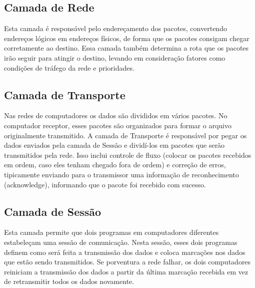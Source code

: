 
\subsection{Camada de Rede}

Esta camada é responsável pelo endereçamento dos pacotes, convertendo endereços lógicos em endereços físicos, de forma que os pacotes consigam chegar corretamente ao destino. Essa camada também determina a rota que os pacotes irão seguir para atingir o destino, levando em consideração fatores como condições de tráfego da rede e prioridades.


\subsection{Camada de Transporte}

Nas redes de computadores os dados são divididos em vários pacotes. No computador receptor, esses pacotes são organizados para formar o arquivo originalmente transmitido. A camada de Transporte é responsável por pegar os dados enviados pela camada de Sessão e dividí-los em pacotes que serão transmitidos pela rede. Isso inclui controle de fluxo (colocar os pacotes recebidos em ordem, caso eles tenham chegado fora de ordem) e correção de erros, tipicamente enviando para o transmissor uma informação de reconhecimento (acknowledge), informando que o pacote foi recebido com sucesso.


\subsection{Camada de Sessão}

Esta camada permite que dois programas em computadores diferentes estabeleçam uma sessão de comunicação. Nesta sessão, esses dois programas definem como será feita a transmissão dos dados e coloca marcações nos dados que estão sendo transmitidos. Se porventura a rede falhar, os dois computadores reiniciam a transmissão dos dados a partir da última marcação recebida em vez de retransmitir todos os dados novamente.

